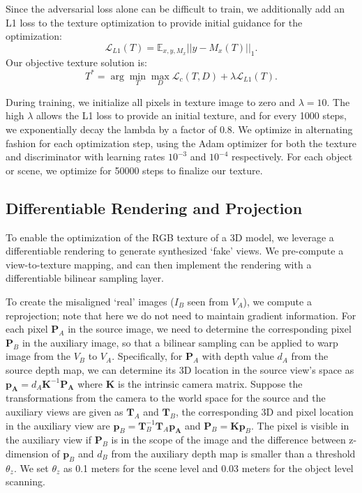%
Since the adversarial loss alone can be difficult to train, we additionally add an L1 loss to the texture optimization to provide initial guidance for the optimization:
%
\begin{equation}
\mathcal{L}_{L1}(T) = \mathbb{E}_{x,y,M_x} ||y - M_x(T)||_1.
\end{equation}
Our objective texture solution is:
\begin{equation}
    T^* = \arg \min_{T} \max_{D} \mathcal{L}_c(T,D) + \lambda \mathcal{L}_{L1}(T).
\end{equation}

%
During training, we initialize all pixels in texture image to zero and $\lambda=10$.
%
The high $\lambda$ allows the L1 loss to provide an initial texture, and for every 1000 steps, we exponentially decay the lambda by a factor of $0.8$.
%
We optimize in alternating fashion for each optimization step, using the Adam optimizer for both the texture and discriminator with learning rates $10^{-3}$ and $10^{-4}$ respectively.
%
For each object or scene, we optimize for 50000 steps to finalize our texture. 
%

\subsection{Differentiable Rendering and Projection}
%
To enable the optimization of the RGB texture of a 3D model, we leverage a differentiable rendering to generate synthesized `fake' views.
We pre-compute a view-to-texture mapping, and can then implement the rendering with a differentiable bilinear sampling layer. 

To create the misaligned `real' images ($I_B$ seen from $V_A$), we compute a reprojection; note that here we do not need to maintain gradient information.
For each pixel $\mathbf{P}_A$ in the source image, we need to determine the corresponding pixel $\mathbf{P}_B$ in the auxiliary image, so that a bilinear sampling can be applied to warp image from the $V_B$ to $V_A$. 
Specifically, for $\mathbf{P}_A$ with depth value $d_A$ from the source depth map, we can determine its 3D location in the source view's space as $\mathbf{p_A}=d_A\mathbf{K}^{-1}\mathbf{P_A}$ where $\mathbf{K}$ is the intrinsic camera matrix. 
Suppose the transformations from the camera to the world space for the source and the auxiliary views are given as $\mathbf{T}_A$ and $\mathbf{T}_B$, the corresponding 3D and pixel location in the auxiliary view are $\mathbf{p}_B=\mathbf{T}_B^{-1}\mathbf{T}_A\mathbf{p_A}$ and $\mathbf{P}_B=\mathbf{K}\mathbf{p}_B$. 
The pixel is visible in the auxiliary view if $\mathbf{P}_B$ is in the scope of the image and the difference between z-dimension of $\mathbf{p}_B$ and $d_B$ from the auxiliary depth map is smaller than a threshold $\theta_z$. We set $\theta_z$ as 0.1 meters for the scene level and 0.03 meters for the object level scanning.

